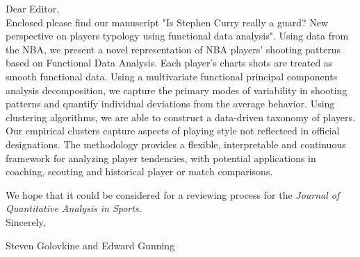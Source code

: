 \documentclass{article}
\date{\today}
\begin{document}
Dear Editor,
\\

Enclosed please find our manuscript "Is Stephen Curry really a guard? New perspective on players typology using functional data analysis". Using data from the NBA, we present a novel representation of NBA players' shooting patterns based on Functional Data Analysis. Each player's charts shots are treated as smooth functional data. Using a multivariate functional principal components analysis decomposition, we capture the primary modes of variability in shooting patterns and quantify individual deviations from the average behavior. Using clustering algorithms, we are able to construct a data-driven taxonomy of players. Our empirical clusters capture aspects of playing style not reflecteed in official designations. The methodology provides a flexible, interpretable and continuous framework for analyzing player tendencies, with potential applications in coaching, scouting and historical player or match comparisons.


We hope that it could be considered for a reviewing process for the \emph{Journal of Quantitative Analysis in Sports}.
\\

Sincerely,

Steven Golovkine and Edward Gunning
\end{document}
